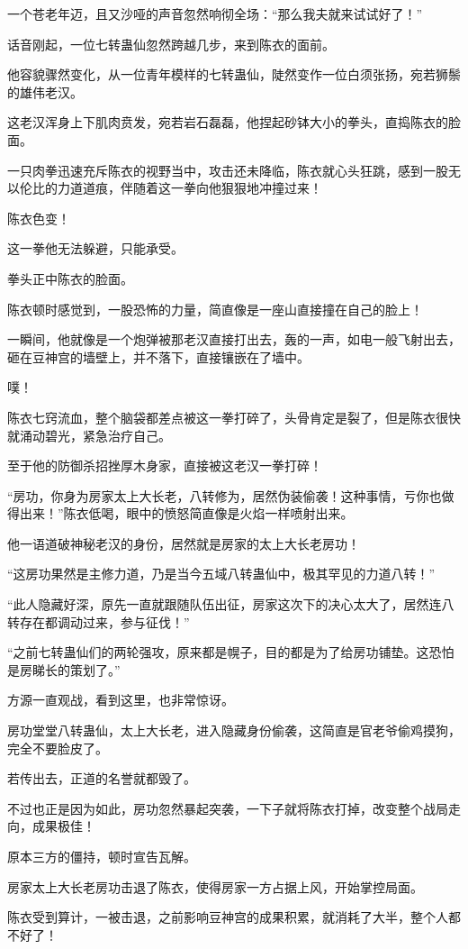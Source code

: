 \begin{this_body}
一个苍老年迈，且又沙哑的声音忽然响彻全场：“那么我夫就来试试好了！”

话音刚起，一位七转蛊仙忽然跨越几步，来到陈衣的面前。

他容貌骤然变化，从一位青年模样的七转蛊仙，陡然变作一位白须张扬，宛若狮鬃的雄伟老汉。

这老汉浑身上下肌肉贲发，宛若岩石磊磊，他捏起砂钵大小的拳头，直捣陈衣的脸面。

一只肉拳迅速充斥陈衣的视野当中，攻击还未降临，陈衣就心头狂跳，感到一股无以伦比的力道道痕，伴随着这一拳向他狠狠地冲撞过来！

陈衣色变！

这一拳他无法躲避，只能承受。

拳头正中陈衣的脸面。

陈衣顿时感觉到，一股恐怖的力量，简直像是一座山直接撞在自己的脸上！

一瞬间，他就像是一个炮弹被那老汉直接打出去，轰的一声，如电一般飞射出去，砸在豆神宫的墙壁上，并不落下，直接镶嵌在了墙中。

噗！

陈衣七窍流血，整个脑袋都差点被这一拳打碎了，头骨肯定是裂了，但是陈衣很快就涌动碧光，紧急治疗自己。

至于他的防御杀招挫厚木身家，直接被这老汉一拳打碎！

“房功，你身为房家太上大长老，八转修为，居然伪装偷袭！这种事情，亏你也做得出来！”陈衣低喝，眼中的愤怒简直像是火焰一样喷射出来。

他一语道破神秘老汉的身份，居然就是房家的太上大长老房功！

“这房功果然是主修力道，乃是当今五域八转蛊仙中，极其罕见的力道八转！”

“此人隐藏好深，原先一直就跟随队伍出征，房家这次下的决心太大了，居然连八转存在都调动过来，参与征伐！”

“之前七转蛊仙们的两轮强攻，原来都是幌子，目的都是为了给房功铺垫。这恐怕是房睇长的策划了。”

方源一直观战，看到这里，也非常惊讶。

房功堂堂八转蛊仙，太上大长老，进入隐藏身份偷袭，这简直是官老爷偷鸡摸狗，完全不要脸皮了。

若传出去，正道的名誉就都毁了。

不过也正是因为如此，房功忽然暴起突袭，一下子就将陈衣打掉，改变整个战局走向，成果极佳！

原本三方的僵持，顿时宣告瓦解。

房家太上大长老房功击退了陈衣，使得房家一方占据上风，开始掌控局面。

陈衣受到算计，一被击退，之前影响豆神宫的成果积累，就消耗了大半，整个人都不好了！


\end{this_body}
